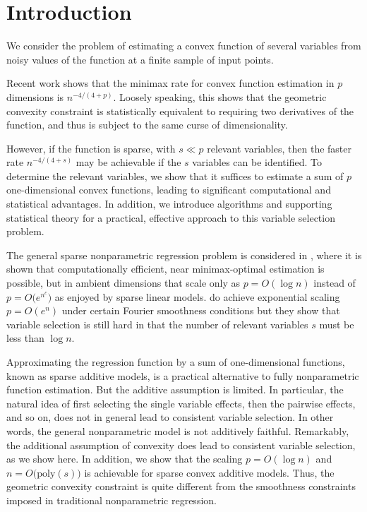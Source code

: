 \section{Introduction}


We consider the problem of estimating a convex function of several
variables from noisy values of the function at a finite sample of
input points.  


Recent work \cite{Guntu:12,Guntu:13} shows that the
minimax rate for convex function estimation in $p$ dimensions is
$n^{-4/(4+p)}$.  Loosely speaking, this shows that the
geometric convexity constraint is statistically equivalent to
requiring two derivatives of the function, and thus is
subject to the same curse of dimensionality.

However, if the function is sparse, with $s\ll p$ relevant variables,
then the faster rate $n^{-4/(4+s)}$ may be achievable if the $s$
variables can be identified.  To determine the relevant variables, we
show that it suffices to estimate a sum of $p$ one-dimensional convex
functions, leading to significant computational and statistical
advantages.  In addition, we introduce algorithms and supporting
statistical theory for a practical, effective approach to this
variable selection problem.

The general sparse nonparametric regression problem is considered in \cite{lafferty2008rodeo}, where it is shown that computationally efficient, near minimax-optimal estimation is possible, but in ambient
dimensions that scale only as $p = O(\log n)$ instead of $p=O\bigl(e^{n^c}\bigr)$ as enjoyed by sparse linear models. \citet{dalalyan:12} do achieve exponential scaling $p=O(e^n)$ under certain Fourier smoothness conditions but they show that variable selection is still hard in that the number of relevant variables $s$ must be less than $\log n$.


Approximating the regression function by a sum of one-dimensional functions, known as sparse additive models, \cite{Ravikumar:09} is a practical alternative to fully
nonparametric function estimation.  But the additive assumption is
limited.  In particular, the natural idea of first selecting the
single variable effects, then the pairwise effects, and so on, does
not in general lead to consistent variable selection.  In other words,
the general nonparametric model is not additively faithful.
Remarkably, the additional assumption of convexity does lead to
consistent variable selection, as we show here. In addition, we show that
the scaling $p = O(\log n)$ and $n = O\big(\textrm{poly}(s)\big)$ is achievable for sparse convex additive models. Thus, the geometric convexity constraint is quite different from the
smoothness constraints imposed in traditional nonparametric
regression.

